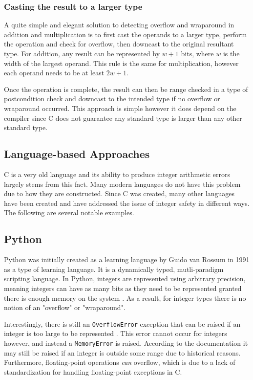 \subsubsection{Casting the result to a larger type}

A quite simple and elegant solution to detecting overflow and wraparound in addition and multiplication is to first cast the operands to a larger type, perform the operation and check for overflow, then downcast to the original resultant type. For addition, any result can be represented by $w+1$ bits, where $w$ is the width of the largest operand. This rule is the same for multiplication, however each operand needs to be at least $2w+1$.

Once the operation is complete, the result can then be range checked in a type of postcondition check and downcast to the intended type if no overflow or wraparound occurred. This approach is simple however it does depend on the compiler since C does not guarantee any standard type is larger than any other standard type.

\subsection{Language-based Approaches}

C is a very old language and its ability to produce integer arithmetic errors largely stems from this fact. Many modern languages do not have this problem due to how they are constructed. Since C was created, many other languages have been created and have addressed the issue of integer safety in different ways. The following are several notable examples.

\subsection{Python}

Python was initially created as a learning language by Guido van Rossum in 1991 as a type of learning language. It is a dynamically typed, mutli-paradigm scripting language. In Python, integers are represented using arbitrary precision, meaning integers can have as many bits as they need to be represented granted there is enough memory on the system \cite{python_types}. As a result, for integer types there is no notion of an "overflow" or "wraparound".

Interestingly, there is still an \texttt{OverflowError} exception that can be raised if an integer is too large to be represented \cite{python_overflow}. This error cannot occur for integers however, and instead a \texttt{MemoryError} is raised. According to the documentation it may still be raised if an integer is outside some range due to historical reasons. Furthermore, floating-point operations \textit{can} overflow, which is due to a lack of standardization for handling floating-point exceptions in C.

